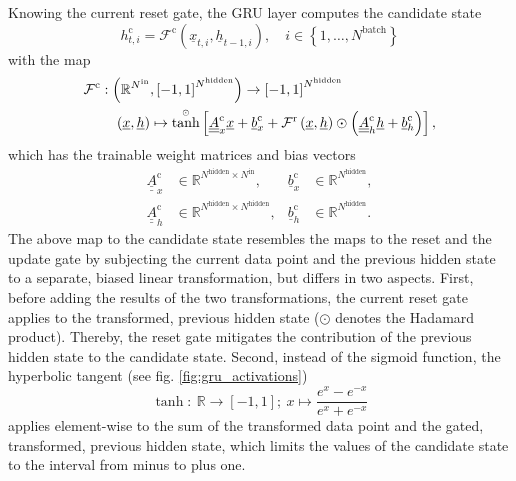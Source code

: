 Knowing the current reset gate, the GRU layer computes the candidate state
\begin{equation}
    h^\text{c}_{t,i}
    =
    \mathcal{F}^\text{c} \left( \underline x_{t,i}, \underline h_{t-1,i}\right)
    ,\quad i \in \left\{1, \dots, N^\text{batch}\right\}
\end{equation}
with the map
\begin{align} \label{eq:gru_candidate}
    \mathcal{F}^\text{c}
    &:
    \left(
        \mathbb{R}^{N^\text{in}}, \left[-1, 1\right]^{N^\text{hidden}}
    \right)
    \rightarrow
    \left[-1, 1\right]^{N^\text{hidden}}
    \nonumber \\ & \quad
    \left(\underline x, \underline h \right)
    \mapsto
    \overset{\scriptscriptstyle \odot}{\tanh} \left[
        \underline{\underline A}^\text{c}_{x}
        \underline x
        +
        \underline b^\text{c}_{x}
        +
        \mathcal{F}^\text{r} \left(\underline x, \underline h \right)
        \odot
        \left(
            \underline{\underline A}^\text{c}_{h}
            \underline h
            +
            \underline b^\text{c}_{h}
        \right)
    \right],
\end{align}
which has the trainable weight matrices and bias vectors
\begin{align} \label{eq:gru_candidate_params}
    \underline{\underline A}^\text{c}_{x} & \in \mathbb{R}^{
        N^\text{hidden}
        \times
        N^\text{in}
    },
    & \underline{b}^\text{c}_{x} & \in \mathbb{R}^{N^\text{hidden}},
    \nonumber \\
    \underline{\underline A}^\text{c}_{h} & \in \mathbb{R}^{
        N^\text{hidden}
        \times
        N^\text{hidden}
    },
    & \underline{b}^\text{c}_{h} & \in \mathbb{R}^{N^\text{hidden}}.
\end{align}
The above map to the candidate state 
resembles the maps to the reset and the update gate 
by subjecting the current data point and the previous hidden state 
to a separate, biased linear transformation, 
but differs in two aspects. 
First, before adding the results of the two transformations, 
the current reset gate applies to the transformed, previous hidden state 
($\odot$ denotes the Hadamard product).
Thereby, the reset gate mitigates the contribution 
of the previous hidden state to the candidate state. 
Second, instead of the sigmoid function, 
the hyperbolic tangent \cite{D.1966} (see fig. \ref{fig:gru_activations})
\begin{equation} \label{eq:tanh}
    \tanh
    :\ 
    \mathbb{R}
    \rightarrow
    \left[
        -1,1
    \right]
    ;\ 
    x 
    \mapsto 
    \frac{
        e^x - e^{-x}
    }{
        e^x + e^{-x}
    }
\end{equation}
applies element-wise to the sum of the transformed data point 
and the gated, transformed, previous hidden state, 
which limits the values of the candidate state 
to the interval from minus to plus one.



